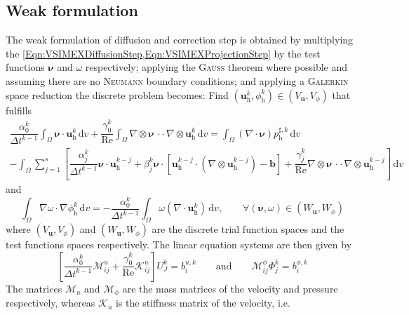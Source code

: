 \documentclass[]{scrartcl}
\renewcommand{\d}{\,\mathrm{d}}
\newcommand{\bs}[1]{\boldsymbol{#1}}
\newcommand{\cdott}{\, {\cdot}{\cdot}\,}
\begin{document}
\subsection{Weak formulation}
The weak formulation of diffusion and correction step is obtained by multiplying the \cref{Eqn:VSIMEXDiffusionStep,Eqn:VSIMEXProjectionStep} by the test functions $\bs{\nu}$ and $\omega$ respectively; applying the \textsc{Gauss} theorem where possible and assuming there are no \textsc{Neumann} boundary conditions; and applying a \textsc{Galerkin} space reduction the discrete problem becomes: Find $(\bs{u}^k_\textrm{h}, \phi^k_\textrm{h}) \in (V_{\bs{u}}, V_\phi)$ that fulfills
\begin{equation*}
\begin{split}
\dfrac{\alpha_0^k}{\Delta t^{k-1}} 
\int_{\Omega}
\bs{\nu} \cdot \bs{u}^k_\textrm{h}
\d v 
+ 
\dfrac{\gamma_0^k}{\textrm{Re}}
\int_{\Omega} 
\nabla \otimes \bs{\nu} \cdott \nabla \otimes \bs{u}^k_\textrm{h}
\d v
=
\int_{\Omega}
(\nabla \cdot \bs{\nu}) p^{\sharp, k}_\textrm{h}
\d v \\
-
\int_{\Omega}
\sum_{j=1}^{s} 
\left[
\dfrac{\alpha_j^k}{\Delta t^{k-1}} \bs{\nu} \cdot \bs{u}^{k-j}_\textrm{h}
+
\beta_j^k \bs{\nu} \cdot \left[ \bs{u}^{k-j}_\textrm{h} \cdot (\nabla \otimes \bs{u}^{k-j}_\textrm{h} ) - \bs{b} \right]
+
\dfrac{\gamma_j^k}{\textrm{Re}} \nabla \otimes \bs{\nu} \cdott \nabla \otimes \bs{u}^{k-j}_\textrm{h}
\right]
\d v
\end{split} 	
\end{equation*}
and 
\begin{equation*}
	\int_{\Omega}
	\nabla \omega \cdot \nabla \phi^k_\textrm{h} 
	\d v
	= 
	- \dfrac{\alpha_0^k}{\Delta t^{k-1}} 
	\int_{\Omega}
	\omega (\nabla \cdot \bs{u}^k_\textrm{h})
	\d v,
	\qquad
	\forall (\bs{\nu}, \omega) \in (W_{\bs{u}}, W_\phi)
\end{equation*}
where $(V_{\bs{u}}, V_\phi)$ and $(W_{\bs{u}}, W_\phi)$ are the discrete trial function spaces and the test functions spaces respectively. The linear equation systems are then given by
\begin{equation*}
	\left[
	\dfrac{\alpha_0^k}{\Delta t^{k-1}} 
	\mathcal{M}^u_{ij}
	+
	\dfrac{\gamma_0^k}{\textrm{Re}}
	\mathcal{K}^u_{ij}
	\right]
	U^k_J
	= 
	b^{u, k}_i
	\qquad \textrm{and} \qquad
	\mathcal{M}^\phi_{ij} \Phi^k_j = b^{\phi, k}_i
\end{equation*}
The matrices $\mathcal{M}_u$ and $\mathcal{M}_\phi$ are the mass matrices of the velocity and pressure respectively, whereas $\mathcal{K}_u$ is the stiffness matrix of the velocity, i.e.
\end{document}
